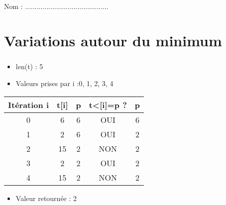 \documentclass[10pt]{article}
\newif\ifprof
\newif\ifxp
\begin{document}
\ifxp

\else

\fi

\ifprof
\else
\begin{center}
\Large Nom  : ...........................................
\end{center}
\fi

 \renewcommand{\baselinestretch}{1.2}
\setlength{\parskip}{2ex plus 0.5ex minus 0.2ex}


\section{Variations autour du minimum}

\subparagraph{}
\textit{}%
\ifprof
\begin{corrige}
\begin{itemize}
\item \textsf{len(t)} : 5
\item Valeurs prises par \textsf{i} :0, 1, 2, 3, 4
\end{itemize}
\begin{center}
\begin{tabular} {|c||c|c||c|c|}
\hline
Itération \textsf{i} & \textsf{t[i]} & \textsf{p} & \textsf{t<[i]=p} ? & p \\
\hline
0 & 6 & 6 & OUI & 6\\
1 & 2 & 6 & OUI & 2\\
2 & 15 & 2  & NON & 2\\
3 &  2 & 2 & OUI & 2\\
4 &  15 & 2 & NON & 2\\
\hline
\end{tabular}
\end{center}

\begin{itemize}
\item Valeur retournée : 2
\end{itemize}
\end{corrige}
\else
\end{document}
